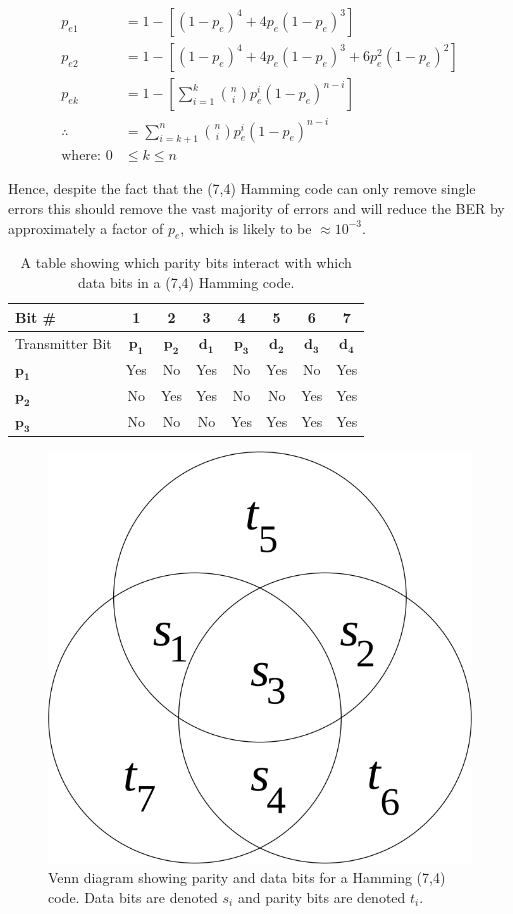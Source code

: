 \documentclass[12pt,onecolumn,letterpaper]{article}
\begin{document}
\begin{subequations}
\begin{align}
   p_{e1} &= 1 - \left[(1-p_e)^{4} + 4p_e(1-p_e)^{3} \right] \label{eq:HammingPe1} \\
   p_{e2} &= 1 - \left[ (1-p_e)^{4} + 4p_e(1-p_e)^{3} + 6p_e^2(1-p_e)^{2} \right] \label{eq:HammingPe2} \\
   p_{ek} &= 1 - \left[ \sum_{i=1}^{k}{n \choose i}p_e^i(1-p_e)^{n-i} \right] \\
   \therefore &= \sum_{i=k+1}^{n}{n \choose i}p_e^i(1-p_e)^{n-i}  
   \label{eq:HammingPeN} \\
   \mbox{where: }0 &\leq k \leq n 
\end{align}
\end{subequations}

Hence, despite the fact that the (7,4) Hamming code can only remove single errors this should remove the vast majority of errors and will reduce the BER by approximately a factor of $p_e$, which is likely to be $\approx10^{-3}$.

\begin{table}[H]
   \begin{center}
   \begin{tabular}{|l|c|c|c|c|c|c|c|}
   \hline
   Bit \# & 1 & 2 & 3 & 4 & 5 & 6 & 7 \\
   \hline\hline
   Transmitter Bit & $\mathbf{p_1}$ & $\mathbf{p_2}$ & $\mathbf{d_1}$ & $\mathbf{p_3}$ & $\mathbf{d_2}$ & $\mathbf{d_3}$ & $\mathbf{d_4}$ \\
   \hline
   $\mathbf{p_1}$ & \cellcolor{green}Yes & \cellcolor{red}No & \cellcolor{green}Yes & \cellcolor{red}No & \cellcolor{green}Yes & \cellcolor{red}No & \cellcolor{green}Yes \\
   $\mathbf{p_2}$ & \cellcolor{red}No & \cellcolor{green}Yes & \cellcolor{green}Yes & \cellcolor{red}No & \cellcolor{red}No & \cellcolor{green}Yes & \cellcolor{green}Yes \\
   $\mathbf{p_3}$ & \cellcolor{red}No & \cellcolor{red}No & \cellcolor{red}No & \cellcolor{green}Yes & \cellcolor{green}Yes & \cellcolor{green}Yes & \cellcolor{green}Yes \\
   \hline
   \end{tabular}
   \end{center}
   \caption{A table showing which parity bits interact with which data bits in a (7,4) Hamming code.}
   \label{tab:Hamming74Parity}
   \end{table}
   

\begin{figure}
   \centering
   \includegraphics[width=0.2\linewidth]{figures/hamming_parity_venn_diagram.png}
   \caption{Venn diagram showing parity and data bits for a Hamming (7,4) code. Data bits are denoted $s_i$ and parity bits are denoted $t_i$.}
   \label{fig:HammingParityVennDiagram}
\end{figure}
\end{document}
